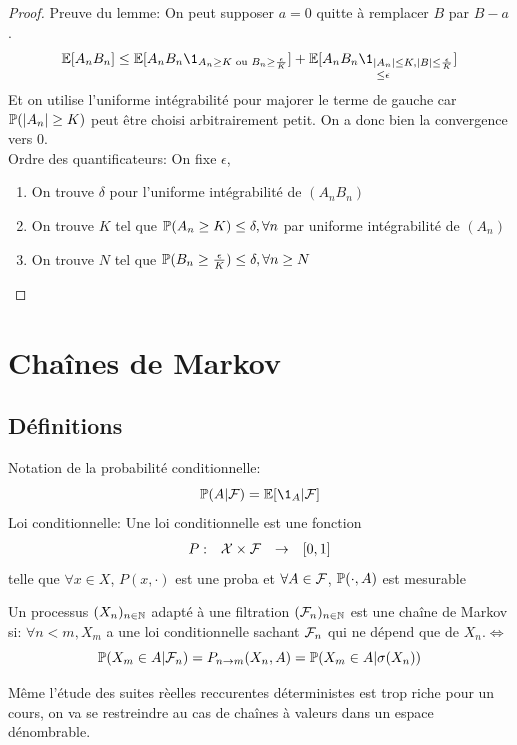 \documentclass[]{report}
\begin{document}
    \begin{proof}
        Preuve du lemme: On peut supposer $a=0$ quitte à remplacer  $B$ par $B-a$.
        \[\Ea[A_n B_n]\le \Ea[A_n B_n\1_{A_n\ge K\text{ ou }B_n\ge \frac{\epsilon}{K}}]+\underset{\le \epsilon}{\Ea[A_n B_n \1_{|A_n|\le K,|B|\le \frac{\epsilon}{K}}]}\]
        Et on utilise l'uniforme intégrabilité pour majorer le terme de gauche car $\mathbb{P}(|A_n|\ge K)$ peut être choisi arbitrairement petit. On a donc bien la convergence vers $0$.\\
        Ordre des quantificateurs: On fixe $\epsilon$,
        \begin{enumerate}
            \item On trouve $\delta$ pour l'uniforme intégrabilité de $(A_nB_n)$
            \item On trouve $K$ tel que $\mathbb{P}(A_n\ge K)\le \delta,\forall n$ par uniforme intégrabilité de $(A_n)$
            \item On trouve $N$ tel que $\mathbb{P}(B_n\ge \frac{\epsilon}{K})\le \delta,\forall n\ge N$
        \end{enumerate}
    \end{proof}

    \chapter{Chaînes de Markov}

    \section{Définitions}

    \begin{nt}{}{}
        Notation de la probabilité conditionnelle:
        \[\Pa(A|\Fr)=\Ea[\1_A|\Fr]\]
        Loi conditionnelle: Une loi conditionnelle est une fonction
        \[\begin{array}{ccccc} P : & \mathcal{X}\times \mathcal{F} & \to & [0,1] \end{array}\]
        telle que $\forall x\in X$, $P(x,\cdot)$ est une proba et $\forall A\in \mathcal{F}$, $\mathbb{P}(\cdot,A)$ est mesurable
    \end{nt}

    \begin{df}{}{}
        Un processus $(X_n)_{n\in\mathbb{N}}$ adapté à une filtration $(\mathcal{F}_n)_{n\in\mathbb{N}}$ est une chaîne de Markov si: $\forall n<m,X_m$ a une loi conditionnelle sachant $\mathcal{F}_n$ qui ne dépend que de $X_n$.$\iff$
        \[\mathbb{P}(X_m\in A|\mathcal{F}_n)=P_{n\to m}(X_n, A)= \mathbb{P}(X_m\in A|\sigma(X_n))\]
    \end{df}

    \begin{re}{}{}
        Même l'étude des suites rèelles reccurentes déterministes est trop riche pour un cours, on va se restreindre au cas de chaînes à valeurs dans un espace dénombrable.
    \end{re}
\end{document}
